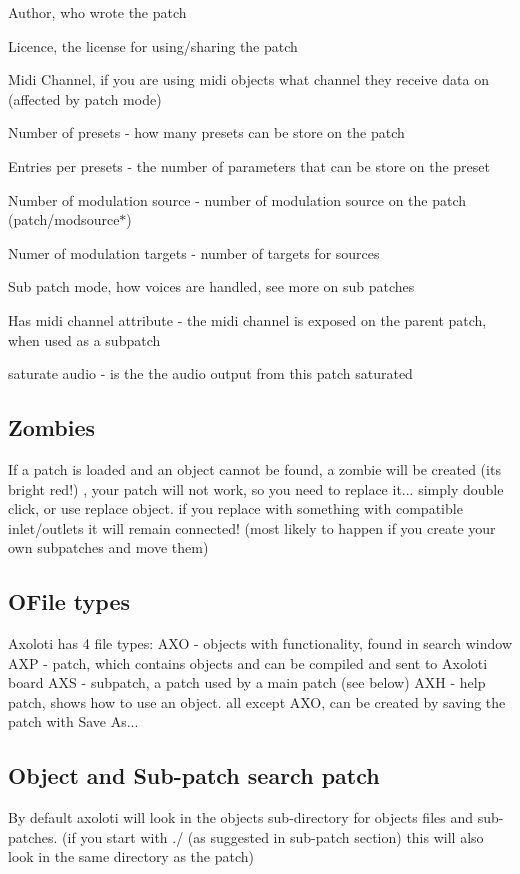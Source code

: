 \begin{DoxyItemize}
\item Author, who wrote the patch 
\item Licence, the license for using/sharing the patch 
\item Midi Channel, if you are using midi objects what channel they receive data on (affected by patch mode) 
\item Number of presets -\/ how many presets can be store on the patch 
\item Entries per presets -\/ the number of parameters that can be store on the preset 
\item Number of modulation source -\/ number of modulation source on the patch (patch/modsource$\ast$) 
\item Numer of modulation targets -\/ number of targets for sources 
\item Sub patch mode, how voices are handled, see \textquotesingle{}more on sub patches\textquotesingle{} 
\item Has midi channel attribute -\/ the midi channel is exposed on the parent patch, when used as a subpatch 
\item saturate audio -\/ is the the audio output from this patch saturated 
\end{DoxyItemize}\hypertarget{axo_gui_axo_gui_axoloti_edit_mode_zombies}{}\subsection{Zombies}\label{axo_gui_axo_gui_axoloti_edit_mode_zombies}
If a patch is loaded and an object cannot be found, a zombie will be created (its bright red!) , your patch will not work, so you need to replace it... simply double click, or use replace object. if you replace with something with compatible inlet/outlets it will remain connected! (most likely to happen if you create your own subpatches and move them)\hypertarget{axo_gui_axo_gui_axoloti_edit_mode_ofiles}{}\subsection{O\+File types}\label{axo_gui_axo_gui_axoloti_edit_mode_ofiles}
Axoloti has 4 file types\+: A\+XO -\/ objects with functionality, found in search window A\+XP -\/ patch, which contains objects and can be compiled and sent to Axoloti board A\+XS -\/ subpatch, a patch used by a main patch (see below) A\+XH -\/ help patch, shows how to use an object. all except A\+XO, can be created by saving the patch with Save As...\hypertarget{axo_gui_axo_gui_axoloti_edit_mode_search}{}\subsection{Object and Sub-\/patch search patch}\label{axo_gui_axo_gui_axoloti_edit_mode_search}
By default axoloti will look in the objects sub-\/directory for objects files and sub-\/patches. (if you start with ./ (as suggested in sub-\/patch section) this will also look in the same directory as the patch)

